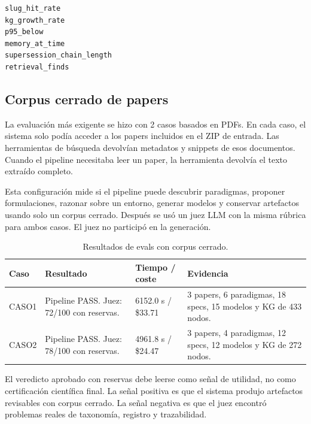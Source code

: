 \begin{verbatim}
slug_hit_rate
kg_growth_rate
p95_below
memory_at_time
supersession_chain_length
retrieval_finds
\end{verbatim}

\subsection{Corpus cerrado de papers}

La evaluación más exigente se hizo con 2 casos basados en PDFs. En cada caso,
el sistema solo podía acceder a los papers incluidos en el ZIP de entrada. Las
herramientas de búsqueda devolvían metadatos y snippets de esos documentos.
Cuando el pipeline necesitaba leer un paper, la herramienta devolvía el texto
extraído completo.

Esta configuración mide si el pipeline puede descubrir paradigmas, proponer
formulaciones, razonar sobre un entorno, generar modelos y conservar artefactos
usando solo un corpus cerrado. Después se usó un juez LLM con la misma rúbrica
para ambos casos. El juez no participó en la generación.

\begin{table}[H]
\begin{center}
\small
\begin{tabular}{|p{1.6cm}|p{2.5cm}|p{2.2cm}|p{5.7cm}|} \hline
\textbf{Caso} & \textbf{Resultado} & \textbf{Tiempo / coste} & \textbf{Evidencia} \\ \hline
CASO1 & Pipeline PASS. Juez: 72/100 con reservas. & 6152.0 s / \$33.71 & 3 papers, 6 paradigmas, 18 specs, 15 modelos y KG de 433 nodos. \\ \hline
CASO2 & Pipeline PASS. Juez: 78/100 con reservas. & 4961.8 s / \$24.47 & 3 papers, 4 paradigmas, 12 specs, 12 modelos y KG de 272 nodos. \\ \hline
\end{tabular}
\caption{Resultados de evals con corpus cerrado.}
\end{center}
\end{table}

El veredicto aprobado con reservas debe leerse como señal de utilidad, no como
certificación científica final. La señal positiva es que el sistema produjo
artefactos revisables con corpus cerrado. La señal negativa es que el juez
encontró problemas reales de taxonomía, registro y trazabilidad.

